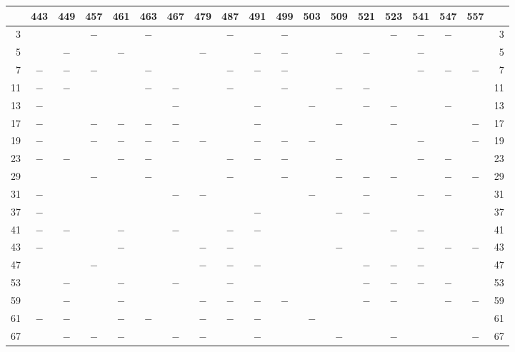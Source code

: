 \begin{center}\begingroup\fontsize{8}{10.5}\selectfont\setlength{\tabcolsep}{2pt}
\begin{tabular}{r|c|c|c|c|c|c|c|c|c|c|c|c|c|c|c|c|c|r}
\hline
 & 443 & 449 & 457 & 461 & 463 & 467 & 479 & 487 & 491 & 499 & 503 & 509 & 521 & 523 & 541 & 547 & 557 & \\
\hline
3 &  &  & $-$ &  & $-$ &  &  & $-$ &  & $-$ &  &  &  & $-$ & $-$ & $-$ &  & 3\\
5 &  & $-$ &  & $-$ &  &  & $-$ &  & $-$ & $-$ &  & $-$ & $-$ &  & $-$ &  &  & 5\\
7 & $-$ & $-$ & $-$ &  & $-$ &  &  & $-$ & $-$ & $-$ &  &  &  &  & $-$ & $-$ & $-$ & 7\\
11 & $-$ & $-$ &  &  & $-$ & $-$ &  & $-$ &  & $-$ &  & $-$ & $-$ &  &  &  &  & 11\\
13 & $-$ &  &  &  &  & $-$ &  &  & $-$ &  & $-$ &  & $-$ & $-$ &  & $-$ &  & 13\\
17 & $-$ &  & $-$ & $-$ & $-$ & $-$ &  &  & $-$ &  &  & $-$ &  & $-$ &  &  & $-$ & 17\\
19 & $-$ &  & $-$ & $-$ & $-$ & $-$ & $-$ &  & $-$ & $-$ & $-$ &  &  &  & $-$ &  & $-$ & 19\\
23 & $-$ & $-$ &  & $-$ & $-$ &  &  & $-$ & $-$ & $-$ &  & $-$ &  &  & $-$ & $-$ &  & 23\\
29 &  &  & $-$ &  & $-$ &  &  & $-$ &  & $-$ &  & $-$ & $-$ & $-$ &  & $-$ & $-$ & 29\\
31 & $-$ &  &  &  &  & $-$ & $-$ &  &  &  & $-$ &  & $-$ &  & $-$ & $-$ &  & 31\\
37 & $-$ &  &  &  &  &  &  &  & $-$ &  &  & $-$ & $-$ &  &  &  &  & 37\\
41 & $-$ & $-$ &  & $-$ &  & $-$ &  & $-$ & $-$ &  &  &  &  & $-$ & $-$ &  &  & 41\\
43 & $-$ &  &  & $-$ &  &  & $-$ & $-$ &  &  &  & $-$ &  &  & $-$ & $-$ & $-$ & 43\\
47 &  &  & $-$ &  &  &  & $-$ & $-$ & $-$ &  &  &  & $-$ & $-$ & $-$ &  &  & 47\\
53 &  & $-$ &  & $-$ &  & $-$ &  & $-$ &  &  &  &  & $-$ & $-$ & $-$ & $-$ &  & 53\\
59 &  & $-$ &  & $-$ &  &  & $-$ & $-$ & $-$ & $-$ &  &  & $-$ & $-$ &  & $-$ & $-$ & 59\\
61 & $-$ & $-$ &  & $-$ & $-$ &  & $-$ & $-$ & $-$ &  & $-$ &  &  &  &  &  &  & 61\\
67 &  & $-$ & $-$ & $-$ &  & $-$ & $-$ &  & $-$ &  &  & $-$ &  & $-$ &  &  & $-$ & 67\\

\end{tabular}
\end{center}
